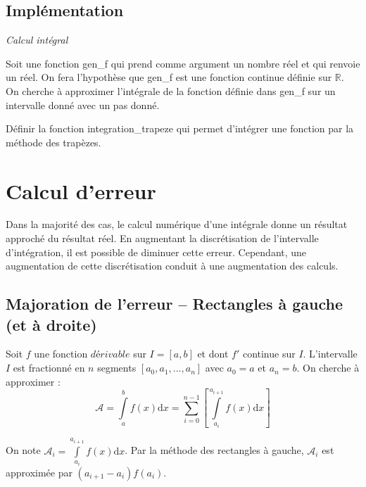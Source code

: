 \documentclass[10pt]{article}
\begin{document}
\begin{minipage}[c]{.38\linewidth}
\end{minipage}

\subsection{Implémentation}
\begin{exemple}
\textit{Calcul intégral}

Soit une fonction \textsf{gen\_f} qui prend comme argument un nombre réel et qui renvoie un réel. On fera l'hypothèse que \textsf{gen\_f} est une fonction continue définie sur $\mathbb{R}$. On cherche à approximer l'intégrale de la fonction définie dans \textsf{gen\_f} sur un intervalle donné avec un pas donné. 

Définir la fonction \textsf{integration\_trapeze} qui permet d'intégrer une fonction par la méthode des trapèzes.

\end{exemple}

\section{Calcul d'erreur}
Dans la majorité des cas, le calcul numérique d'une intégrale donne un résultat approché du résultat réel. En augmentant la discrétisation de l'intervalle d'intégration, il est possible de diminuer cette erreur. Cependant, une augmentation de cette discrétisation conduit à une augmentation des calculs. 


\subsection{Majoration de l'erreur -- Rectangles à gauche (et à droite)}
Soit $f$ une fonction $dérivable$ sur $I=[a,b]$ et dont $f'$ continue sur $I$. L'intervalle $I$ est fractionné en $n$ segments $[a_0, a_1, ..., a_n]$ avec $a_0 = a$ et $a_n=b$. On cherche à approximer :
$$
\mathcal{A}=\int\limits_a^{b}f(x)\mathrm{d}x =  \sum\limits_{i=0}^{n-1} \left[\int\limits_{a_i}^{a_{i+1}}f(x)\mathrm{d}x \right]
$$

On note $\mathcal{A}_i = \int\limits_{a_i}^{a_{i+1}}f(x)\mathrm{d}x $. Par la méthode des rectangles à gauche, $\mathcal{A}_i$ est approximée par $\left(a_{i+1}-a_{i}\right) f(a_i) $. 
\end{document}
